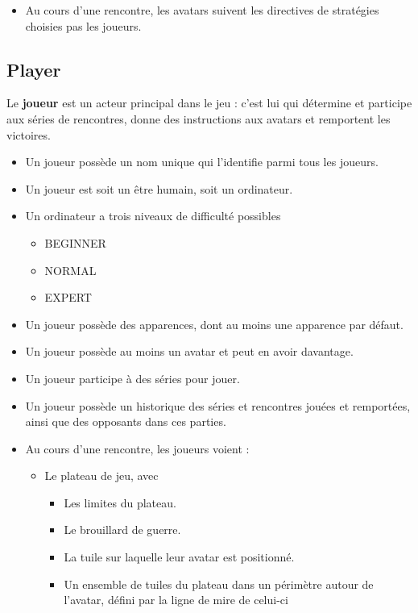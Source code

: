 \begin{itemize}
        \item Au cours d'une rencontre, les avatars suivent les directives de stratégies choisies pas les joueurs.
    \end{itemize}
    
\subsection{Player}
Le \textbf{joueur} est un acteur principal dans le jeu : c'est lui qui détermine et participe aux séries de rencontres, donne des instructions aux avatars et remportent les victoires.
    \begin{itemize}
        \item Un joueur possède un nom unique qui l'identifie parmi tous les joueurs.
        \item Un joueur est soit un être humain, soit un ordinateur.
        \item Un ordinateur a trois niveaux de difficulté possibles
            \begin{itemize}
                \item BEGINNER
                \item NORMAL
                \item EXPERT
            \end{itemize}
        \item Un joueur possède des apparences, dont au moins une apparence par défaut.
        \item Un joueur possède au moins un avatar et peut en avoir davantage.
        \item Un joueur participe à des séries pour jouer.    
        \item Un joueur possède un historique des séries et rencontres jouées et remportées, ainsi que des opposants dans ces parties.
        \item Au cours d'une rencontre, les joueurs voient :
            \begin{itemize}
                \item Le plateau de jeu, avec 
                    \begin{itemize}
                        \item Les limites du plateau.
                        \item Le brouillard de guerre.
                        \item La tuile sur laquelle leur avatar est positionné.
                        \item Un ensemble de tuiles du plateau dans un périmètre autour de l'avatar, défini par la ligne de mire de celui-ci

\end{itemize}
\end{itemize}
\end{itemize}
